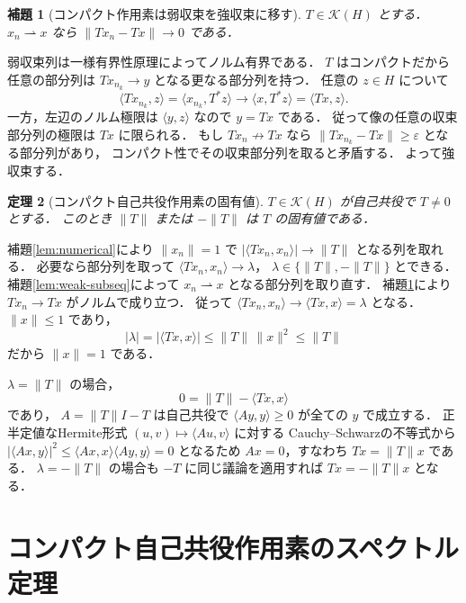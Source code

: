 \documentclass[a5paper,10pt,onecolumn]{jsarticle}
\makeatletter
\theoremstyle{mathnotetheorem}
\newtheorem{theorem}{定理}[section]
\newtheorem{lemma}[theorem]{補題}
\renewcommand{\proofname}{証明}
\renewenvironment{proof}[1][\proofname]{%
  \par\pushQED{\qed}\normalfont\topsep4\p@\@plus2\p@\relax
  \trivlist\item[\hskip\labelsep\bfseries #1]\ignorespaces
}{\popQED\endtrivlist\@endpefalse}
\newcommand{\norm}[1]{\lVert #1\rVert}
\makeatother
\begin{document}
\begin{lemma}[コンパクト作用素は弱収束を強収束に移す]
\label{lem:compact-weak}
$T\in\mathcal K(H)$ とする．
$x_n\rightharpoonup x$ なら
$\norm{Tx_n-Tx}\to0$ である．
\end{lemma}
\begin{proof}
弱収束列は一様有界性原理によってノルム有界である．
$T$ はコンパクトだから任意の部分列は
$Tx_{n_k}\to y$ となる更なる部分列を持つ．
任意の $z\in H$ について
\[
 \langle Tx_{n_k},z\rangle
 =\langle x_{n_k},T^*z\rangle
 \longrightarrow\langle x,T^*z\rangle
 =\langle Tx,z\rangle.
\]
一方，左辺のノルム極限は $\langle y,z\rangle$ なので
$y=Tx$ である．
従って像の任意の収束部分列の極限は $Tx$ に限られる．
もし $Tx_n\not\to Tx$ なら
$\norm{Tx_{n_k}-Tx}\ge\varepsilon$ となる部分列があり，
コンパクト性でその収束部分列を取ると矛盾する．
よって強収束する．
\end{proof}

\begin{theorem}[コンパクト自己共役作用素の固有値]
\label{thm:norm-eigen}
$T\in\mathcal K(H)$ が自己共役で $T\ne0$ とする．
このとき $\norm T$ または $-\norm T$ は $T$ の固有値である．
\end{theorem}
\begin{proof}
補題\ref{lem:numerical}により
$\norm{x_n}=1$ で
$|\langle Tx_n,x_n\rangle|\to\norm T$
となる列を取れる．
必要なら部分列を取って
$\langle Tx_n,x_n\rangle\to\lambda$，
$\lambda\in\{\norm T,-\norm T\}$ とできる．
補題\ref{lem:weak-subseq}によって
$x_n\rightharpoonup x$ となる部分列を取り直す．
補題\ref{lem:compact-weak}により
$Tx_n\to Tx$ がノルムで成り立つ．
従って
$\langle Tx_n,x_n\rangle\to\langle Tx,x\rangle=\lambda$
となる．
$\norm x\le1$ であり，
\[
 |\lambda|=|\langle Tx,x\rangle|
 \le\norm T\,\norm x^2\le\norm T
\]
だから $\norm x=1$ である．

$\lambda=\norm T$ の場合，
\[
 0=\norm T-\langle Tx,x\rangle
\]
であり，
$A=\norm T I-T$ は自己共役で
$\langle Ay,y\rangle\ge0$ が全ての $y$ で成立する．
正半定値なHermite形式
$(u,v)\mapsto\langle Au,v\rangle$ に対する
Cauchy--Schwarzの不等式から
$|\langle Ax,y\rangle|^2\le
 \langle Ax,x\rangle\langle Ay,y\rangle=0$
となるため $Ax=0$，すなわち $Tx=\norm T x$ である．
$\lambda=-\norm T$ の場合も $-T$ に同じ議論を適用すれば
$Tx=-\norm T x$ となる．
\end{proof}

\section{コンパクト自己共役作用素のスペクトル定理}
\end{document}

